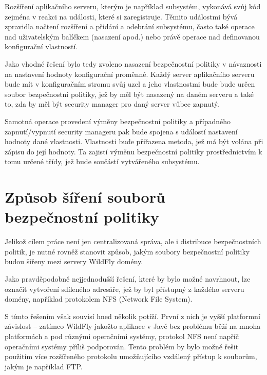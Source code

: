 Rozšíření aplikačního serveru, kterým je například subsystém, vykonává svůj kód zejména v reakci na události, které si zaregistruje. Těmito událostmi bývá zpravidla načtení rozšíření a přidání a odebrání subsystému, často také operace nad uživatelským balíčkem (nasazení apod.) nebo právě operace nad definovanou konfigurační vlastností. \cite{WildFlyExtending}

Jako vhodné řešení bylo tedy zvoleno nasazení bezpečnostní politiky v návaznosti na nastavení hodnoty konfigurační proměnné. Každý server aplikačního serveru bude mít v konfiguračním stromu svůj uzel a jeho vlastnostmi bude bude určen soubor bezpečnostní politiky, jež by měl být nasazený na daném serveru a také to, zda by měl být security manager pro daný server vůbec zapnutý.

Samotná operace provedení výměny bezpečnostní politiky a případného zapnutí/vypnutí security manageru pak bude spojena s událostí nastavení hodnoty dané vlastnosti. Vlastnosti bude přiřazena metoda, jež má být volána při zápisu do její hodnoty. Ta zajistí výměnu bezpečnostní politiky prostřednictvím k tomu určené třídy, jež bude součástí vytvářeného subsystému.

\section{Způsob šíření souborů bezpečnostní politiky} \label{sireniSouboru}

Jelikož cílem práce není jen centralizovaná správa, ale i distribuce bezpečnostních politik, je nutné rovněž stanovit způsob, jakým soubory bezpečnostní politiky budou šířeny mezi servery WildFly domény.

Jako pravděpodobně nejjednodušší řešení, které by bylo možné navrhnout, lze označit vytvoření sdíleného adresáře, jež by byl přístupný z každého serveru domény, například protokolem NFS (Network File System).

S tímto řešením však souvisí hned několik potíží. První z nich je vyšší platformní závislost -- zatímco WildFly jakožto aplikace v Javě bez problému běží na mnoha platformách a pod různými operačními systémy, protokol NFS není napříč operačními systémy příliš podporován. Tento problém by bylo možné řešit použitím více rozšířeného protokolu umožňujícího vzdálený přístup k souborům, jakým je například FTP.


